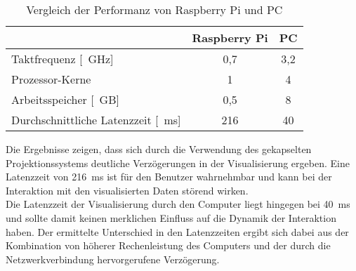 
\begin{table}[ht]
\caption{Vergleich der Performanz von Raspberry Pi und PC}
\begin{center}
\begin{tabular}{|l|c|c|}
\hline
\rowcolor{lightgray} & \multicolumn{1}{|c|}{\textbf{Raspberry Pi}} & \multicolumn{1}{|c|}{\textbf{PC}}\\
\hline
Taktfrequenz [\SI{}{\GHz}] & 0,7 & 3,2 \\
\hline
Prozessor-Kerne & 1 & 4\\
\hline
Arbeitsspeicher [\SI{}{GB}] & 0,5 & 8\\
\hline
Durchschnittliche Latenzzeit [\SI{}{\milli\second}] & 216 & 40 \\
\hline
\end{tabular}
\end{center}
\label{tab.latency}
\end{table}


Die Ergebnisse zeigen, dass sich durch die Verwendung des gekapselten Projektionssystems deutliche Verzögerungen in der Visualisierung ergeben. Eine Latenzzeit von \SI{216}{\milli\second} ist für den Benutzer wahrnehmbar und kann bei der Interaktion mit den visualisierten Daten störend wirken.\\
Die Latenzzeit der Visualisierung durch den Computer liegt hingegen bei \SI{40}{\milli\second} und sollte damit keinen merklichen Einfluss auf die Dynamik der Interaktion haben. Der ermittelte Unterschied in den Latenzzeiten ergibt sich dabei aus der Kombination von höherer Rechenleistung des Computers und der  durch die Netzwerkverbindung hervorgerufene Verzögerung.\\

